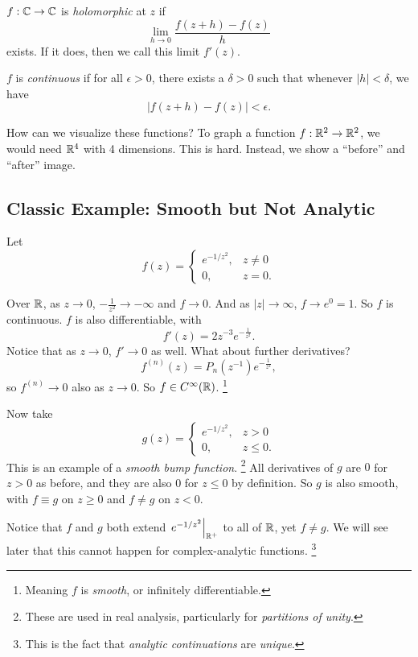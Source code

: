 \begin{tcolorbox}[title=Definition (Holomorphic)]
  $f : \mathbb{C} \to \mathbb{C}$ is \textit{holomorphic} at $z$ if
  \[
    \lim_{h \to 0} \frac{f(z + h) - f(z)}{h}
  \]
  exists. If it does, then we call this limit $f'(z)$.
\end{tcolorbox}

\begin{tcolorbox}[title=Definition (Continuity)]
  $f$ is \textit{continuous} if for all $\epsilon > 0$,
  there exists a $\delta > 0$ such that whenever
  $|h|  < \delta$, we have
  \[
  |f(z + h) - f(z)| < \epsilon
  .\] 
\end{tcolorbox}

How can we visualize these functions?
To graph a function $f : \mathbb{R}^2 \to \mathbb{R}^2$, we would need
$\mathbb{R}^4$ with 4 dimensions. This is hard. Instead,
we show a ``before'' and ``after'' image.


\subsection{Classic Example: Smooth but Not Analytic}
Let
\[
f(z) =
\begin{cases}
  e^{-1 / z^2}, & z \neq 0 \\
  0, & z = 0.
\end{cases}
\] 

Over $\mathbb{R}$, as $z \to 0$, $-\frac{1}{z^2} \to -\infty$
and $f \to 0$.  And as $|z| \to \infty$, $f \to e^0 = 1$. 
So $f$ is continuous. $f$ is also differentiable,
with
\[f'(z) = 2z^{-3}e^{-\frac{1}{z^2}}.\]
Notice that as $z \to 0$, $f' \to 0$ as well. What
about further derivatives?
\[
  f^{(n)}(z) = P_n(z^{-1})e^{-\frac{1}{z^2}}
,\] 
so $f^{(n)} \to 0$ also as $z \to 0$. So
$f \in C^\infty(\mathbb{R})$.
\footnote{Meaning $f$ is \textit{smooth}, or infinitely
differentiable.}

Now take
\[
g(z) =
\begin{cases}
  e^{-1 / z^2}, & z > 0 \\
  0, & z \le 0.
\end{cases}
\]
This is an example of a \textit{smooth bump function}.
\footnote{These are used in real analysis, particularly
for \textit{partitions of unity}.}
All derivatives of $g$ are $0$ for $z > 0$ as before,
and they are also $0$ for $z \le 0$ by definition. So
$g$ is also smooth, with $f \equiv g$ on $z \ge 0$ and
$f \ne g$ on $z < 0$.

Notice that $f$ and $g$ both extend
$\left.e^{-1 / z^2}\right\rvert_{\mathbb{R}^+}$ to all of $\mathbb{R}$,
yet $f \ne g$. We will see later that this cannot
happen for complex-analytic functions.
\footnote{This is the fact that \textit{analytic continuations} are \textit{unique}.}

